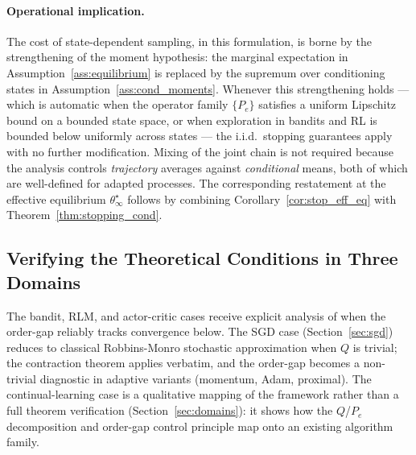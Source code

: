 \documentclass[12pt,a4paper]{article}
\begin{document}
\paragraph{Operational implication.}
The cost of state-dependent sampling, in this formulation, is borne by the
strengthening of the moment hypothesis: the marginal expectation in
Assumption~\ref{ass:equilibrium} is replaced by the supremum over
conditioning states in Assumption~\ref{ass:cond_moments}. Whenever this
strengthening holds — which is automatic when the operator family $\{P_e\}$
satisfies a uniform Lipschitz bound on a bounded state space, or when
exploration in bandits and RL is bounded below uniformly across states —
the i.i.d.\ stopping guarantees apply with no further modification. Mixing
of the joint chain is not required because the analysis controls
\emph{trajectory} averages against \emph{conditional} means, both of which
are well-defined for adapted processes. The corresponding restatement at
the effective equilibrium $\theta^\star_\infty$ follows by combining
Corollary~\ref{cor:stop_eff_eq} with Theorem~\ref{thm:stopping_cond}.

\subsection{Verifying the Theoretical Conditions in Three Domains}
\label{sec:theory_domains}

The bandit, RLM, and actor-critic cases receive explicit analysis of when
the order-gap reliably tracks convergence below. The SGD case
(Section~\ref{sec:sgd}) reduces to classical Robbins-Monro stochastic
approximation \citep{robbins1951stochastic,borkar2008stochastic} when $Q$
is trivial; the contraction theorem applies verbatim, and the order-gap
becomes a non-trivial diagnostic in adaptive variants (momentum, Adam,
proximal). The continual-learning case is a qualitative mapping of the
framework rather than a full theorem verification (Section~\ref{sec:domains}):
it shows how the $Q$/$P_e$ decomposition and order-gap control principle
map onto an existing algorithm family.
\end{document}
